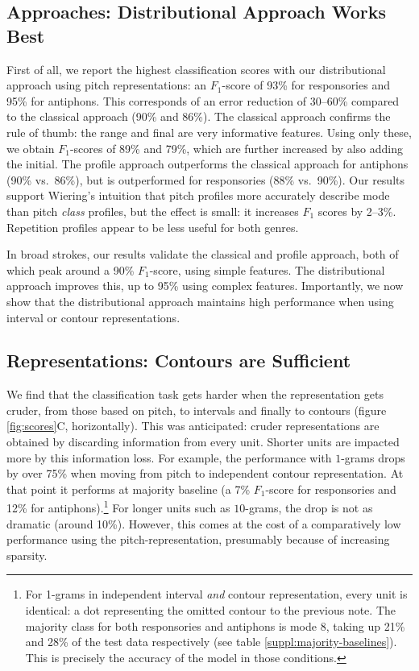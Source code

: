\documentclass{article}
\begin{document}
\subsection{Approaches: Distributional Approach Works Best}

First of all, we report the highest classification scores with our distributional approach using pitch representations: an $F_1$-score of 93\% for responsories and 95\% for antiphons.
This corresponds of an error reduction of 30--60\% compared to the classical approach (90\% and 86\%).
The classical approach confirms the rule of thumb: the range and final are very informative features.
Using only these, we obtain $F_1$-scores of 89\% and 79\%, which are further increased by also adding the initial.
The profile approach outperforms the classical approach for antiphons (90\% vs.~86\%), but is outperformed for responsories (88\% vs.~90\%).
Our results support Wiering's \cite{Wiering2006} intuition that pitch profiles more accurately describe mode than pitch \emph{class} profiles, but the effect is small: it increases $F_1$ scores by 2--3\%.
Repetition profiles appear to be less useful for both genres.


In broad strokes, our results validate the classical and profile approach, both of which peak around a 90\% $F_1$-score, using simple features.
The distributional approach improves this, up to 95\% using complex features.
Importantly, we now show that the distributional approach maintains high performance when using interval or contour representations.



\subsection{Representations: Contours are Sufficient}

We find that the classification task gets harder when the representation gets cruder, from those based on pitch, to intervals and finally to contours (figure \ref{fig:scores}C, horizontally).
This was anticipated: cruder representations are obtained by discarding information from every unit.
Shorter units are impacted more by this information loss.
For example, the performance with $1$-grams drops by over 75\% when moving from pitch to independent contour representation.
At that point it performs at majority baseline (a 7\% $F_1$-score for responsories and 12\% for antiphons).\footnote{%
    For 1-grams in independent interval \emph{and} contour representation, every unit is identical: a dot representing the omitted contour to the previous note. 
    The majority class for both responsories and antiphons is mode 8, taking up 21\% and 28\% of the test data respectively (see table \ref{suppl:majority-baselines}).
    This is precisely the accuracy of the model in those conditions.
    }
For longer units such as $10$-grams, the drop is not as dramatic (around 10\%).
However, this comes at the cost of a comparatively low performance using the pitch-representation, presumably because of increasing sparsity.
\end{document}
